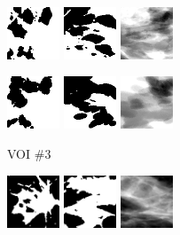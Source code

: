 \documentclass[journal]{IEEEtran}
\begin{document}
\begin{figure}[!htb]
  \includegraphics[width=0.14\textwidth]
  {figure/all/dataset_7/roi_coronal}
  \includegraphics[width=0.14\textwidth]
  {figure/all/dataset_7/roi_saggital}
  \includegraphics[width=0.14\textwidth]
  {figure/all/dataset_7/proj_roi}

  \includegraphics[width=0.14\textwidth]
  {figure/all/dataset_7/model_coronal}
  \includegraphics[width=0.14\textwidth]
  {figure/all/dataset_7/model_saggital}
  \includegraphics[width=0.14\textwidth]
  {figure/all/dataset_7/proj_roi_inten10}

  {\fontsize{9}{9}\selectfont VOI \#3} \vspace{1mm}

  \includegraphics[width=0.14\textwidth]
  {figure/all/dataset_11/roi_coronal}
  \includegraphics[width=0.14\textwidth]
  {figure/all/dataset_11/roi_saggital}
  \includegraphics[width=0.14\textwidth]
  {figure/all/dataset_11/proj_roi}


\end{figure}
\end{document}
